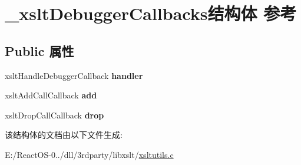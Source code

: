 \hypertarget{struct__xslt_debugger_callbacks}{}\section{\+\_\+xslt\+Debugger\+Callbacks结构体 参考}
\label{struct__xslt_debugger_callbacks}
\subsection*{Public 属性}
\begin{DoxyCompactItemize}
\item 
\mbox{\label{struct__xslt_debugger_callbacks_a312387432f277e05507b82e5f562d285}} 
xslt\+Handle\+Debugger\+Callback {\bfseries handler}
\item 
\mbox{\label{struct__xslt_debugger_callbacks_a6f6965baee8ed78d1daa55565277748c}} 
xslt\+Add\+Call\+Callback {\bfseries add}
\item 
\mbox{\label{struct__xslt_debugger_callbacks_af66bae98721e9e5fa46ae1f3a6dda72a}} 
xslt\+Drop\+Call\+Callback {\bfseries drop}
\end{DoxyCompactItemize}


该结构体的文档由以下文件生成\+:\begin{DoxyCompactItemize}
\item 
E\+:/\+React\+O\+S-\/0../dll/3rdparty/libxslt/\hyperlink{xsltutils_8c}{xsltutils.\+c}\end{DoxyCompactItemize}
